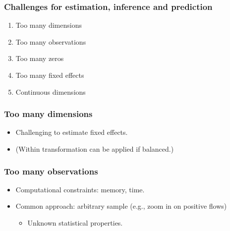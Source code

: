 \documentclass[compress,mathserif]{beamer}
\begin{document}
\begin{frame}\frametitle{Challenges for estimation, inference and prediction}\hypertarget{Challenges for estimation, inference and prediction}{}
\begin{enumerate}\setcounter{enumi}{0}
\item Too many dimensions

\item Too many observations

\item Too many zeros

\item Too many fixed effects
\pause



\item Continuous dimensions


\end{enumerate}
\end{frame}



\begin{frame}\frametitle{Too many dimensions}\hypertarget{Too many dimensions}{}
\begin{itemize}
\item Challenging to estimate fixed effects.

\item (Within transformation can be applied if balanced.)


\end{itemize}
\end{frame}



\begin{frame}\frametitle{Too many observations}\hypertarget{Too many observations}{}
\begin{itemize}
\item Computational constraints: memory, time.

\item Common approach: arbitrary sample (e.g., zoom in on positive flows)
\begin{itemize}
\item Unknown statistical properties.


\end{itemize}

\end{itemize}
\end{frame}
\end{document}
